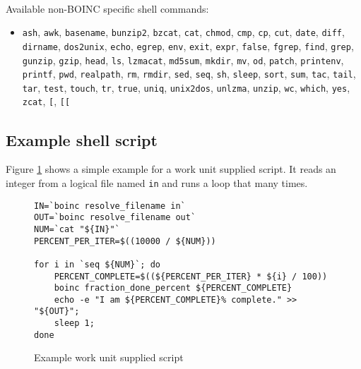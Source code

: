 \documentclass[a4paper,12pt,titlepage,dvipdfm]{article}
\begin{document}
\paragraph*{} Available non-BOINC specific shell commands:
\begin{itemize}
    \item \texttt{ash}, \texttt{awk}, \texttt{basename}, \texttt{bunzip2}, \texttt{bzcat}, \texttt{cat}, \texttt{chmod}, \texttt{cmp}, \texttt{cp},
     \texttt{cut}, \texttt{date}, \texttt{diff}, \texttt{dirname}, \texttt{dos2unix}, \texttt{echo}, \texttt{egrep}, \texttt{env}, \texttt{exit}, 
     \texttt{expr}, \texttt{false}, \texttt{fgrep}, \texttt{find}, \texttt{grep}, \texttt{gunzip}, \texttt{gzip}, \texttt{head}, \texttt{ls},
     \texttt{lzmacat}, \texttt{md5sum}, \texttt{mkdir}, \texttt{mv}, \texttt{od}, \texttt{patch}, \texttt{printenv}, \texttt{printf}, \texttt{pwd},
     \texttt{realpath}, \texttt{rm}, \texttt{rmdir}, \texttt{sed}, \texttt{seq}, \texttt{sh}, \texttt{sleep}, \texttt{sort}, \texttt{sum},
     \texttt{tac}, \texttt{tail}, \texttt{tar}, \texttt{test}, \texttt{touch}, \texttt{tr}, \texttt{true}, \texttt{uniq}, \texttt{unix2dos},
     \texttt{unlzma}, \texttt{unzip}, \texttt{wc}, \texttt{which}, \texttt{yes}, \texttt{zcat}, \texttt{[}, \texttt{[[}
\end{itemize}

\subsection{Example shell script}

Figure \ref{fig:wuscript} shows a simple example for a work unit supplied script. It reads an integer from a logical file named \texttt{in} and runs a loop that many times. 

\lstset{
  breaklines=true,                                     %
  language=make,
  frame=trbl,
  framesep=5pt,
  basicstyle=\small,
  keywordstyle=\ttfamily,
  identifierstyle=\texttt,
  stringstyle=\ttfamily,
  linewidth=\textwidth,
  numbers=none
}

\begin{figure}[htb]
\begin{lstlisting}[breaklines=true]
IN=`boinc resolve_filename in`
OUT=`boinc resolve_filename out`
NUM=`cat "${IN}"`
PERCENT_PER_ITER=$((10000 / ${NUM}))

for i in `seq ${NUM}`; do
	PERCENT_COMPLETE=$((${PERCENT_PER_ITER} * ${i} / 100))
	boinc fraction_done_percent ${PERCENT_COMPLETE}
	echo -e "I am ${PERCENT_COMPLETE}% complete." >> "${OUT}";
	sleep 1;
done
\end{lstlisting}
\caption{Example work unit supplied script}\label{fig:wuscript}
\end{figure}
\end{document}
